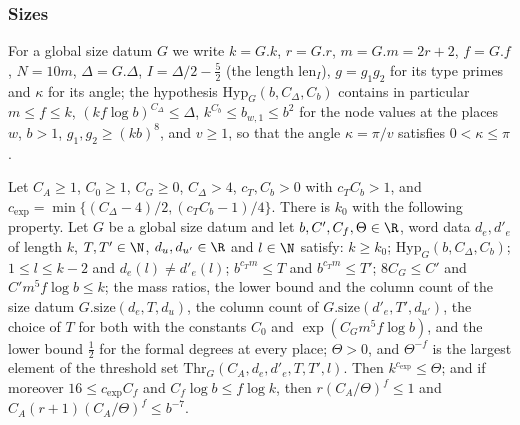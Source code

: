 \subsubsection{Sizes}\label{sec:pf:thmS:sizes}

For a global size datum $G$ we write $k=G.k$, $r=G.r$, $m=G.m=2r+2$, $f=G.f$, $N=10m$, $\Delta=G.\Delta$, $I=\Delta/2-\frac52$ (the
length $\mathrm{len}_I$), $g=g_1g_2$ for its type primes and $\kappa$ for its angle; the hypothesis $\mathrm{Hyp}_G(b,C_\Delta,C_b)$
contains in particular $m\le f\le k$, $(kf\log b)^{C_\Delta}\le\Delta$, $k^{C_b}\le b_{w,1}\le b^2$ for the node values at the
places $w$, $b>1$, $g_1,g_2\ge(kb)^8$, and $v\ge1$, so that the angle $\kappa=\pi/v$ satisfies $0<\kappa\le\pi$.

\begin{theorem}\label{pf:thmS:sizesmain}
Let $C_A\ge1$, $C_0\ge1$, $C_G\ge0$, $C_\Delta>4$, $c_T,C_b>0$ with $c_TC_b>1$, and
$c_{\exp}=\min\{(C_\Delta-4)/2,(c_TC_b-1)/4\}$. There is $k_0$ with the following property. Let $G$ be a global size datum and
let $b,C',C_f,\Theta\in\R$, word data $d_e,d'_e$ of length $k$, $T,T'\in\N$, $d_u,d_{u'}\in\R$ and $l\in\N$ satisfy: $k\ge k_0$;
$\mathrm{Hyp}_G(b,C_\Delta,C_b)$; $1\le l\le k-2$ and $d_e(l)\ne d'_e(l)$; $b^{c_Tm}\le T$ and $b^{c_Tm}\le T'$; $8C_G\le C'$
and $C'm^5f\log b\le k$; the mass ratios, the lower bound and the column count of the size datum $G.\mathrm{size}(d_e,T,d_u)$,
the column count of $G.\mathrm{size}(d'_e,T',d_{u'})$, the choice of $T$ for both with the constants $C_0$ and
$\exp(C_Gm^5f\log b)$, and the lower bound $\frac12$ for the formal degrees at every place; $\Theta>0$, and $\Theta^{-f}$ is the
largest element of the threshold set $\mathrm{Thr}_G(C_A,d_e,d'_e,T,T',l)$. Then $k^{c_{\exp}}\le\Theta$; and if moreover
$16\le c_{\exp}C_f$ and $C_f\log b\le f\log k$, then $r(C_A/\Theta)^f\le1$ and $C_A(r+1)(C_A/\Theta)^f\le b^{-7}$.
\end{theorem}


